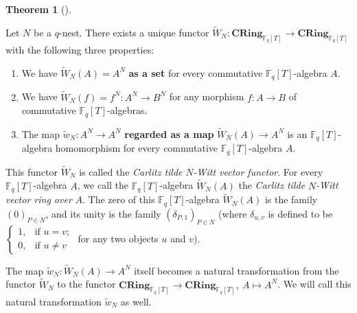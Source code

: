 \documentclass[numbers=enddot,12pt,final,onecolumn,notitlepage]{scrartcl}%
\theoremstyle{definition}
\newtheorem{theo}{Theorem}[section]
\newenvironment{theorem}[1][]
{\begin{theo}[#1]\begin{leftbar}}
{\end{leftbar}\end{theo}}
\begin{document}
\begin{theorem}
\label{thm.carlitz.Witt.class.tilde}Let $N$ be a $q$-nest. There exists a
unique functor $\widetilde{W}_{N}:\mathbf{CRing}_{\mathbb{F}_{q}\left[
T\right]  }\rightarrow\mathbf{CRing}_{\mathbb{F}_{q}\left[  T\right]  }$ with
the following three properties:

\begin{enumerate}
\item We have $\widetilde{W}_{N}\left(  A\right)  =A^{N}$ \textbf{as a set}
for every commutative $\mathbb{F}_{q}\left[  T\right]  $-algebra $A$.

\item We have $\widetilde{W}_{N}\left(  f\right)  =f^{N}:A^{N}\rightarrow
B^{N}$ for any morphism $f:A\rightarrow B$ of commutative $\mathbb{F}%
_{q}\left[  T\right]  $-algebras.

\item The map $\widetilde{w}_{N}:A^{N}\rightarrow A^{N}$ \textbf{regarded as a
map }$\widetilde{W}_{N}\left(  A\right)  \rightarrow A^{N}$ is an
$\mathbb{F}_{q}\left[  T\right]  $-algebra homomorphism for every commutative
$\mathbb{F}_{q}\left[  T\right]  $-algebra $A$.
\end{enumerate}

This functor $\widetilde{W}_{N}$ is called the \textit{Carlitz tilde }%
$N$\textit{-Witt vector functor}. For every $\mathbb{F}_{q}\left[  T\right]
$-algebra $A$, we call the $\mathbb{F}_{q}\left[  T\right]  $-algebra
$\widetilde{W}_{N}\left(  A\right)  $ the \textit{Carlitz tilde }%
$N$\textit{-Witt vector ring over }$A$. The zero of this $\mathbb{F}%
_{q}\left[  T\right]  $-algebra $\widetilde{W}_{N}\left(  A\right)  $ is the
family $\left(  0\right)  _{P\in N}$, and its unity is the family $\left(
\delta_{P,1}\right)  _{P\in N}$ (where $\delta_{u,v}$ is defined to be $%
\begin{cases}
1, & \text{if }u=v;\\
0, & \text{if }u\neq v
\end{cases}
$ for any two objects $u$ and $v$).

The map $\widetilde{w}_{N}:\widetilde{W}_{N}\left(  A\right)  \rightarrow
A^{N}$ itself becomes a natural transformation from the functor $\widetilde{W}%
_{N}$ to the functor $\mathbf{CRing}_{\mathbb{F}_{q}\left[  T\right]
}\rightarrow\mathbf{CRing}_{\mathbb{F}_{q}\left[  T\right]  },\ A\mapsto
A^{N}$. We will call this natural transformation $\widetilde{w}_{N}$ as well.
\end{theorem}
\end{document}
